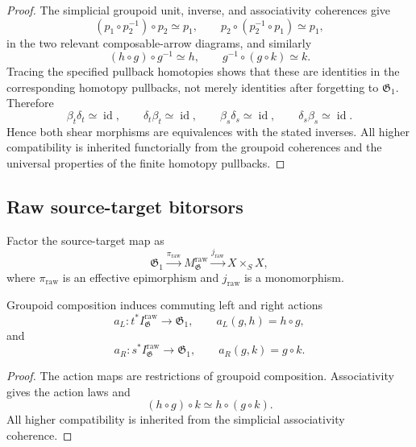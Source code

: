 \begin{proof}
The simplicial groupoid unit, inverse, and associativity coherences give
\[
    (p_1\circ p_2^{-1})\circ p_2\simeq p_1,
    \qquad
    p_2\circ(p_2^{-1}\circ p_1)\simeq p_1,
\]
in the two relevant composable-arrow diagrams, and similarly
\[
    (h\circ g)\circ g^{-1}\simeq h,
    \qquad
    g^{-1}\circ(g\circ k)\simeq k.
\]
Tracing the specified pullback homotopies shows that these are identities in
the corresponding homotopy pullbacks, not merely identities after forgetting
to $\mathfrak G_1$.  Therefore
\[
    \beta_t\delta_t\simeq\operatorname{id},
    \qquad
    \delta_t\beta_t\simeq\operatorname{id},
    \qquad
    \beta_s\delta_s\simeq\operatorname{id},
    \qquad
    \delta_s\beta_s\simeq\operatorname{id}.
\]
Hence both shear morphisms are equivalences with the stated inverses.  All
higher compatibility is inherited functorially from the groupoid coherences
and the universal properties of the finite homotopy pullbacks.
\end{proof}

\subsection{Raw source-target bitorsors}

Factor the source-target map as
\[
    \mathfrak G_1
    \xrightarrow{\pi_{\mathrm{raw}}}
    M^{\mathrm{raw}}_{\mathfrak G}
    \xrightarrow{j_{\mathrm{raw}}}
    X\times_SX,
\]
where $\pi_{\mathrm{raw}}$ is an effective epimorphism and
$j_{\mathrm{raw}}$ is a monomorphism.

\begin{proposition}
\label{prop:isotropy-actions}
Groupoid composition induces commuting left and right actions
\[
    a_L:
    t^*I^{\mathrm{raw}}_{\mathfrak G}
    \longrightarrow
    \mathfrak G_1,
    \qquad
    a_L(g,h)=h\circ g,
\]
and
\[
    a_R:
    s^*I^{\mathrm{raw}}_{\mathfrak G}
    \longrightarrow
    \mathfrak G_1,
    \qquad
    a_R(g,k)=g\circ k.
\]
\end{proposition}

\begin{proof}
The action maps are restrictions of groupoid composition.  Associativity gives
the action laws and
\[
    (h\circ g)\circ k
    \simeq
    h\circ(g\circ k).
\]
All higher compatibility is inherited from the simplicial associativity
coherence.
\end{proof}

